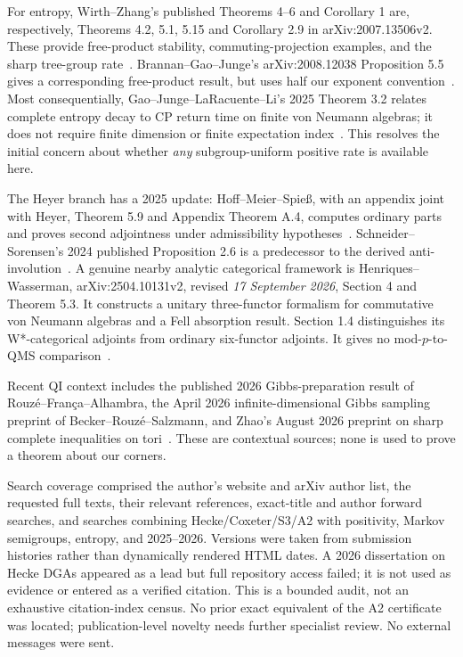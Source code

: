 \documentclass[11pt]{article}
\theoremstyle{remark}\newtheorem{remark}[definition]{Remark}
\begin{document}
For entropy, Wirth--Zhang's published Theorems 4--6 and Corollary 1
are, respectively, Theorems 4.2, 5.1, 5.15 and Corollary 2.9 in
arXiv:2007.13506v2. These provide free-product stability, commuting-projection
examples, and the sharp tree-group rate~\cite{WirthZhang2021}.
Brannan--Gao--Junge's arXiv:2008.12038 Proposition 5.5 gives a corresponding
free-product result, but uses half our exponent convention~\cite{BrannanGaoJunge2020II}.
Most consequentially, Gao--Junge--LaRacuente--Li's 2025 Theorem 3.2 relates
complete entropy decay to CP return time on finite von Neumann algebras;
it does not require finite dimension or finite expectation index~\cite{GaoJungeLaRacuenteLi2025}. This resolves the initial concern about
whether \emph{any} subgroup-uniform positive rate is available here.

The Heyer branch has a 2025 update: Hoff--Meier--Spie\ss, with an appendix
joint with Heyer, Theorem 5.9 and Appendix Theorem A.4, computes ordinary
parts and proves second adjointness under admissibility hypotheses~\cite{HoffMeierSpiessHeyer2025}. Schneider--Sorensen's 2024 published
Proposition 2.6 is a predecessor to the derived anti-involution~\cite{SchneiderSorensen2024}. A genuine nearby analytic categorical
framework is Henriques--Wasserman, arXiv:2504.10131v2, revised
\emph{17 September 2026}, Section 4 and Theorem 5.3. It constructs a unitary
three-functor formalism for commutative von Neumann algebras and a Fell
absorption result. Section 1.4 distinguishes its W*-categorical adjoints
from ordinary six-functor adjoints. It gives no mod-$p$-to-QMS comparison~\cite{HenriquesWasserman2025}.

Recent QI context includes the published 2026 Gibbs-preparation result of
Rouz\'e--Fran\c{c}a--Alhambra, the April 2026 infinite-dimensional Gibbs
sampling preprint of Becker--Rouz\'e--Salzmann, and Zhao's August 2026
preprint on sharp complete inequalities on tori~\cite{RouzeFrancaAlhambra2026,BeckerRouzeSalzmann2026,Zhao2026}.
These are contextual sources; none is used to prove a theorem about our corners.

Search coverage comprised the author's website and arXiv author list, the
requested full texts, their relevant references, exact-title and author
forward searches, and searches combining Hecke/Coxeter/S3/A2 with positivity,
Markov semigroups, entropy, and 2025--2026. Versions were taken from submission
histories rather than dynamically rendered HTML dates. A 2026 dissertation
on Hecke DGAs appeared as a lead but full repository access failed; it is not
used as evidence or entered as a verified citation. This is a bounded audit,
not an exhaustive citation-index census. No prior exact equivalent of the
A2 certificate was located; publication-level novelty needs further specialist
review. No external messages were sent.
\end{document}

